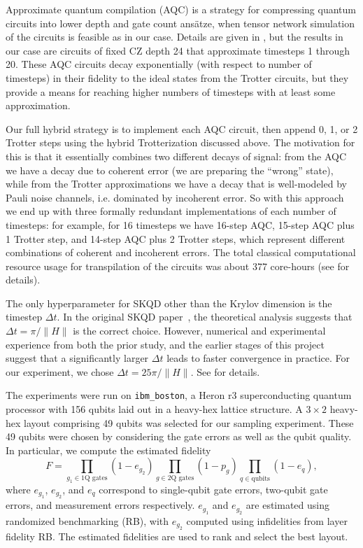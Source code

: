 \documentclass[
  reprint,            %
  amsmath,amssymb,
  aps,
  superscriptaddress, %
  longbibliography
]{revtex4-2}
\theoremstyle{definition}
\begin{document}
Approximate quantum compilation (AQC) is a strategy for compressing quantum circuits into lower depth and gate count ans\"atze, when tensor network simulation of the circuits is feasible as in our case.
Details are given in , but the results in our case are circuits of fixed CZ depth 24 that approximate timesteps 1 through 20.
These AQC circuits decay exponentially (with respect to number of timesteps) in their fidelity to the ideal states from the Trotter circuits, but they provide a means for reaching higher numbers of timesteps with at least some approximation.

Our full hybrid strategy is to implement each AQC circuit, then append 0, 1, or 2 Trotter steps using the hybrid Trotterization discussed above.
The motivation for this is that it essentially combines two different decays of signal: from the AQC we have a decay due to coherent error (we are preparing the ``wrong'' state), while from the Trotter approximations we have a decay that is well-modeled by Pauli noise channels, i.e. dominated by incoherent error.
So with this approach we end up with three formally redundant implementations of each number of timesteps: for example, for 16 timesteps we have 16-step AQC, 15-step AQC plus 1 Trotter step, and 14-step AQC plus 2 Trotter steps, which represent different combinations of coherent and incoherent errors.
The total classical computational resource usage for transpilation of the circuits was about 377 core-hours (see  for details).

The only hyperparameter for SKQD other than the Krylov dimension is the timestep $\Delta t$.
In the original SKQD paper~\cite{yu2025quantum}, the theoretical analysis suggests that $\Delta t=\pi/\|H\|$ is the correct choice.
However, numerical and experimental experience from both the prior study, and the earlier stages of this project suggest that a significantly larger $\Delta t$ leads to faster convergence in practice.
For our experiment, we chose $\Delta t=25\pi/\|H\|$.
See  for details.

The experiments were run on \texttt{ibm\_boston}, a Heron r3 superconducting quantum processor with 156 qubits laid out in a heavy-hex lattice structure. A $3 \times 2$ heavy-hex layout comprising 49 qubits was selected for our sampling experiment. These 49 qubits were chosen by considering the gate errors as well as the qubit quality. In particular, we compute the estimated fidelity
\begin{equation}
    F = \prod_{g_1 \in \text{1Q gates}} (1-e_{g_2}) \prod_{g \in \text{2Q gates}} (1-p_g) \prod_{q \in \text{qubits}} (1-e_q),
\end{equation}
where $e_{g_1}$,  $e_{g_2}$, and $e_q$ correspond to single-qubit gate errors, two-qubit gate errors, and measurement errors respectively. $e_{g_1}$ and $e_{g_2}$ are estimated using randomized benchmarking (RB), with $e_{g_2}$ computed using infidelities from layer fidelity RB. The estimated fidelities are used to rank and select the best layout.
\end{document}
